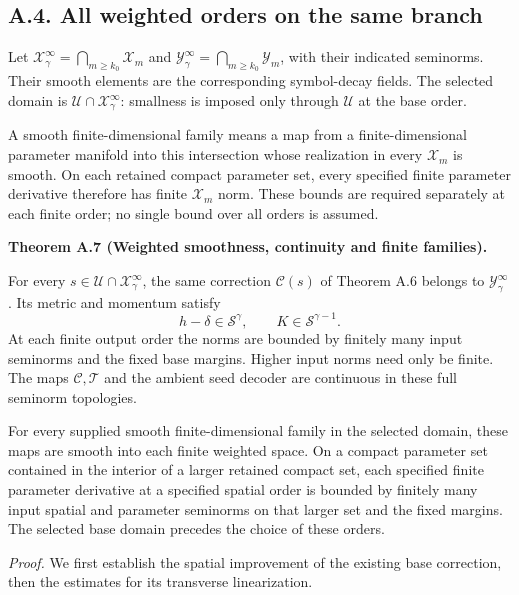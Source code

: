 \documentclass[
  english,
  11pt,
  reqno]{amsart}
\makeatletter
\newcommand{\pandocstatementheading}[1]{%
  \par\addpenalty{\@beginparpenalty}%
  \addvspace{.5\baselineskip plus .2\baselineskip minus .2\baselineskip}%
  {\normalfont\bfseries #1\par}%
  \nobreak\@afterindenttrue\@afterheading
}
\makeatother
\begin{document}
\subsection{A.4. All weighted orders on the same
branch}\label{a.4.-all-weighted-orders-on-the-same-branch}\label{sec:online-chart-same-branch-smoothness}

Let \(\mathcal X^\infty_\gamma=\bigcap_{m\ge k_0}\mathcal X_m\) and
\(\mathcal Y^\infty_\gamma=\bigcap_{m\ge k_0}\mathcal Y_m\), with their
indicated seminorms. Their smooth elements are the corresponding
symbol-decay fields. The selected domain is
\(\mathcal U\cap\mathcal X^\infty_\gamma\): smallness is imposed only
through \(\mathcal U\) at the base order.

A smooth finite-dimensional family means a map from a finite-dimensional
parameter manifold into this intersection whose realization in every
\(\mathcal X_m\) is smooth. On each retained compact parameter set,
every specified finite parameter derivative therefore has finite
\(\mathcal X_m\) norm. These bounds are required separately at each
finite order; no single bound over all orders is assumed.

\pandocstatementheading{\leavevmode{}\label{thm:online-chart-one-branch-weighted-smoothness}Theorem A.7 (Weighted smoothness, continuity and finite families).}

For every \(s\in\mathcal U\cap\mathcal X^\infty_\gamma\), the same
correction \(\mathcal C(s)\) of Theorem A.6 belongs to
\(\mathcal Y^\infty_\gamma\). Its metric and momentum satisfy \[
h-\delta\in\mathscr S^\gamma,\qquad
K\in\mathscr S^{\gamma-1}.
\] At each finite output order the norms are bounded by finitely many
input seminorms and the fixed base margins. Higher input norms need only
be finite. The maps \(\mathcal C,\mathcal T\) and the ambient seed
decoder are continuous in these full seminorm topologies.

For every supplied smooth finite-dimensional family in the selected
domain, these maps are smooth into each finite weighted space. On a
compact parameter set contained in the interior of a larger retained
compact set, each specified finite parameter derivative at a specified
spatial order is bounded by finitely many input spatial and parameter
seminorms on that larger set and the fixed margins. The selected base
domain precedes the choice of these orders.

\emph{Proof.} We first establish the spatial improvement of the existing
base correction, then the estimates for its transverse linearization.
\end{document}
